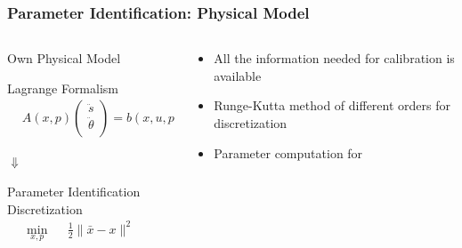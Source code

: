 \begin{frame}
    \frametitle{Parameter Identification: Physical Model}
    \vspace{-1cm}
    \begin{columns}[onlytextwidth]
        \begin{column}{0.5\textwidth}
            \begin{block}{Own Physical Model}
                
                    {Lagrange Formalism}
                    \small{{\begin{align*}
	                        &A(x,p)
	                \begin{pmatrix} 
	                \ddot{s} \\ \ddot{\theta} \\
	                \end{pmatrix}
	                = b(x,u,p)
                    \end{align*}}}
            \vspace{-0.3cm}   
            \end{block}
            \vspace{-0.1cm}
            
            $\Downarrow$
            
            \begin{block}{Parameter Identification}
            Discretization
            \small{\begin{align*}
                \min_{x,p} & & \frac{1}{2} \| \bar{x} - x \|^2 & & \\
            \end{align*}}
            \vspace{-1cm}
            \end{block}
            \vspace{-1.5cm}
        \end{column}
    
    \begin{column}{0.45\textwidth}
        \begin{itemize}
            \vspace{0.6cm}
            \item{All the information needed for calibration is available}
            \vspace{0.3cm}
            \item{Runge-Kutta method of different orders for discretization}
            \vspace{0.3cm}
            \item{Parameter computation for}
        \end{itemize}
    \end{column}    
    \end{columns}
\end{frame}        
        
